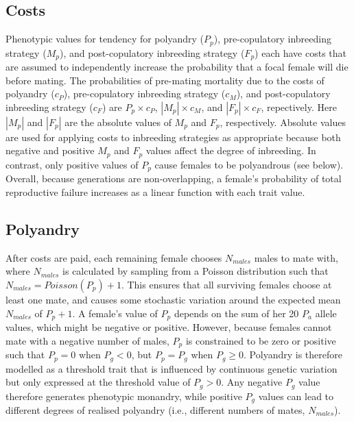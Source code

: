 \documentclass[10pt,letterpaper]{article}
\begin{document}
\subsection*{Costs}

Phenotypic values for tendency for polyandry ($P_{p}$), pre-copulatory inbreeding strategy ($M_{p}$), and post-copulatory inbreeding strategy ($F_{p}$) each have costs that are assumed to independently increase the probability that a focal female will die before mating. The probabilities of pre-mating mortality due to the costs of polyandry ($c_{P}$), pre-copulatory inbreeding strategy ($c_{M}$), and post-copulatory inbreeding strategy ($c_{F}$) are $P_{p} \times c_{P}$, $|M_{p}| \times c_{M}$, and $|F_{p}| \times c_{F}$, repectively. Here $|M_{p}|$ and $|F_{p}|$ are the absolute values of $M_{p}$ and $F_{p}$, respectively. Absolute values are used for applying costs to inbreeding strategies as appropriate because both negative and positive $M_{p}$ and $F_{p}$ values affect the degree of inbreeding. In contrast, only positive values of $P_{p}$ cause females to be polyandrous (see below). Overall, because generations are non-overlapping, a female's probability of total reproductive failure increases as a linear function with each trait value.

\subsection*{Polyandry}

After costs are paid, each remaining female chooses $N_{males}$ males to mate with, where $N_{males}$ is calculated by sampling from a Poisson distribution such that $N_{males} = Poisson(P_{p}) + 1$. This ensures that all surviving females choose at least one mate, and causes some stochastic variation around the expected mean $N_{males}$ of $P_{p}+1$. A female's value of $P_{p}$ depends on the sum of her 20 $P_{a}$ allele values, which might be negative or positive. However, because females cannot mate with a negative number of males, $P_{p}$ is constrained to be zero or positive such that $P_{p} = 0$ when $P_{g} < 0$, but $P_{p} = P_{g}$ when $P_{g} \geq 0$. Polyandry is therefore modelled as a threshold trait \cite[][]{Lynch1998, Roff1996, Roff1998, Duthie} that is influenced by continuous genetic variation but only expressed at the threshold value of $P_{g} > 0$. Any negative $P_{g}$ value therefore generates phenotypic monandry, while positive $P_{g}$ values can lead to different degrees of realised polyandry (i.e., different numbers of mates, $N_{males}$).
\end{document}
